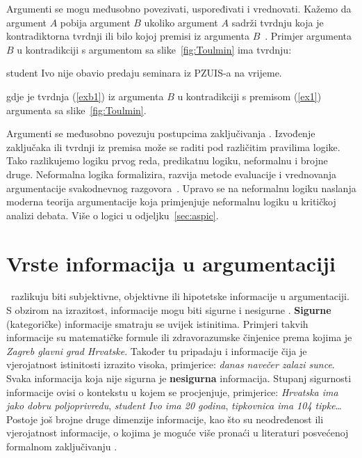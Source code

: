 Argumenti se mogu međusobno povezivati, uspoređivati i vrednovati.  Kažemo da
argument $A$ pobija  argument $B$ ukoliko argument $A$ sadrži
tvrdnju koja je kontradiktorna tvrdnji ili bilo kojoj premisi iz argumenta
$B$~\citep{besnard2008elements}. Primjer argumenta $B$ u kontradikciji s
argumentom sa slike~\ref{fig:Toulmin} ima tvrdnju:
\begin{exe}
    \ex\label{exb1} student Ivo nije obavio predaju seminara iz PZUIS-a na vrijeme. 
\end{exe}
gdje je tvrdnja (\ref{exb1}) iz argumenta $B$ u kontradikciji s premisom (\ref{ex1})
argumenta sa slike~\ref{fig:Toulmin}. 

Argumenti se međusobno povezuju postupcima zaključivanja . 
Izvođenje zaključaka ili tvrdnji iz premisa može se raditi pod različitim pravilima 
logike. 
Tako razlikujemo logiku prvog reda, predikatnu logiku, neformalnu i brojne druge. 
Neformalna logika  formalizira, 
razvija metode evaluacije i vrednovanja
argumentacije svakodnevnog razgovora~\citep{fogelin1985logic, blair2000informal}. 
Upravo se na neformalnu logiku naslanja moderna teorija argumentacije koja primjenjuje 
neformalnu logiku u kritičkoj analizi debata. Više o logici u odjeljku~\ref{sec:aspic}.

\section{Vrste informacija u argumentaciji}

\cite{besnard2008elements}~razlikuju biti subjektivne, objektivne ili hipotetske informacije u 
argumentaciji. 
S obzirom na izrazitost, informacije mogu biti 
sigurne  i nesigurne . \textbf{Sigurne} (kategoričke)
informacije smatraju se uvijek istinitima. Primjeri takvih informacije su
matematičke formule ili zdravorazumske činjenice prema kojima je \emph{Zagreb glavni
grad Hrvatske}. Također tu pripadaju i informacije čija je vjerojatnost istinitosti 
izrazito visoka, primjerice: \emph{danas navečer zalazi sunce}. Svaka informacija 
koja nije sigurna je \textbf{nesigurna} informacija. Stupanj sigurnosti informacije
ovisi o kontekstu u kojem se procjenjuje, primjerice: \emph{Hrvatska ima jako dobru poljoprivredu},  
\emph{student Ivo ima 20 godina}, \emph{tipkovnica ima 104 tipke}\dots 
Postoje još brojne druge dimenzije informacije, kao što
su neodređenost ili vjerojatnost informacije, o kojima je moguće 
više pronaći u literaturi posvećenoj formalnom zaključivanju
\citep{wang2004ontology}. 

